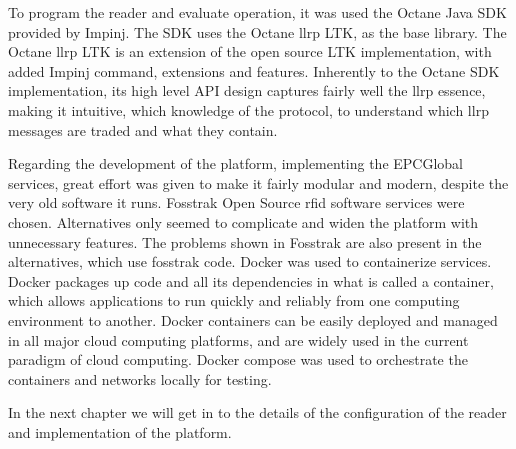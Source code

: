 To program the reader and evaluate operation, it was used the Octane Java SDK provided by Impinj. 
The SDK uses the Octane \ac{llrp} LTK, as the base library. The Octane \ac{llrp} LTK is an extension of the open source LTK implementation, with added Impinj command, extensions and features.
Inherently to the Octane SDK implementation, its high level API design captures fairly well the \ac{llrp} essence, making it intuitive, which knowledge of the protocol, to understand which \ac{llrp} messages are traded and what they contain.

Regarding the development of the platform, implementing the EPCGlobal services, great effort was given to make it fairly modular and modern, despite the very old software it runs.
Fosstrak Open Source \ac{rfid} software services were chosen. Alternatives only seemed to complicate and widen the platform with unnecessary features. The problems shown in Fosstrak are also present in the alternatives, which use fosstrak code.
Docker was used to containerize services. 
Docker packages up code and all its dependencies in what is called a container, which allows applications to run quickly and reliably from one computing environment to another. Docker containers can be easily deployed and managed in all major cloud computing platforms, and are widely used in the current paradigm of cloud computing.
Docker compose was used to orchestrate the containers and networks locally for testing.

In the next chapter we will get in to the details of the configuration of the reader and implementation of the platform.
